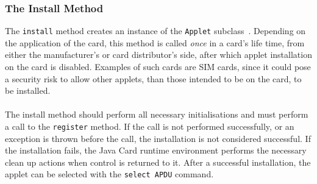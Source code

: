\subsubsection{The Install Method}\label{subsec:jcinstall}
The \texttt{install} method creates an instance of the \texttt{Applet} subclass~\cite[p. 65]{java_card_spec}. Depending on the application of the card, this method is called \textit{once} in a card's life time, from either the manufacturer's or card distributor's side, after which applet installation on the card is disabled. Examples of such cards are SIM cards, since it could pose a security risk to allow other applets, than those intended to be on the card, to be installed.\\\\
The install method should perform all necessary initialisations and must perform a call to the \texttt{register} method. If the call is not performed successfully, or an exception is thrown before the call, the installation is not considered successful. If the installation fails, the Java Card runtime environment performs the necessary clean up actions when control is returned to it. After a successful installation, the applet can be selected with the \texttt{select APDU} command.
